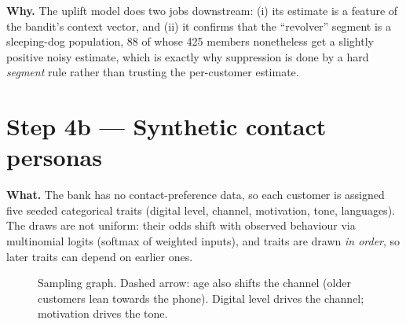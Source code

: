 \documentclass[11pt,a4paper]{article}
\newcommand{\why}[1]{\par\needspace{6\baselineskip}\smallskip\noindent\textbf{\textcolor{ca}{Why.}} #1\par}
\begin{document}
\why{The uplift model does two jobs downstream: (i) its estimate is a feature of the bandit's context vector, and
(ii) it confirms that the ``revolver'' segment is a sleeping-dog population, 88 of whose 425 members nonetheless
get a slightly positive noisy estimate, which is exactly why suppression is done by a hard \emph{segment} rule rather
than trusting the per-customer estimate.}

\section{Step 4b --- Synthetic contact personas}

\textbf{What.} The bank has no contact-preference data, so each customer is assigned five seeded categorical traits
(digital level, channel, motivation, tone, languages). The draws are not uniform: their odds shift with observed behaviour via
multinomial logits (softmax of weighted inputs), and traits are drawn \emph{in order}, so later traits can depend on earlier ones.

\begin{figure}[h]
\centering
{}
\caption{Sampling graph. Dashed arrow: age also shifts the channel (older customers lean towards the phone).
Digital level drives the channel; motivation drives the tone.}
\end{figure}
\end{document}
